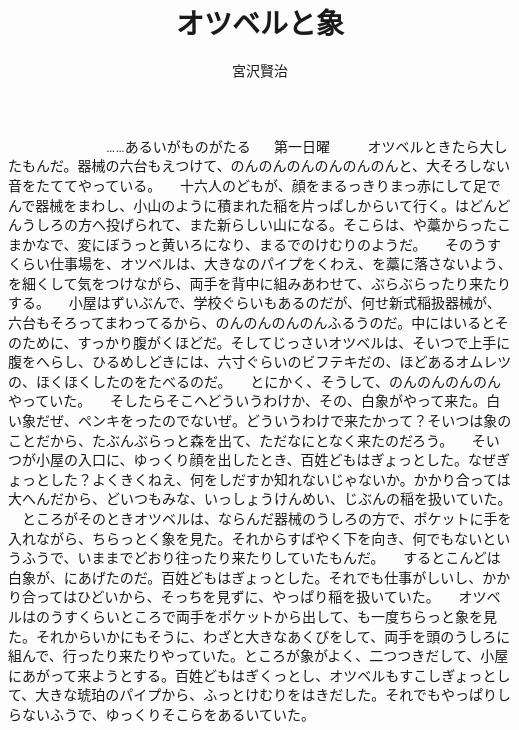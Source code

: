 \documentclass[a5paper, twocolumn]{tbook}
\title{オツベルと象}
\author{宮沢賢治}
\date{}
\begin{document}
\maketitle
　　　　　　　……あるいがものがたる
　
第一日曜
　
　オツベルときたら大したもんだ。器械の六台もえつけて、のんのんのんのんのんのんと、大そろしない音をたててやっている。
　十六人のどもが、顔をまるっきりまっ赤にして足でんで器械をまわし、小山のように積まれた稲を片っぱしからいて行く。はどんどんうしろの方へ投げられて、また新らしい山になる。そこらは、や藁からったこまかなで、変にぼうっと黄いろになり、まるでのけむりのようだ。
　そのうすくらい仕事場を、オツベルは、大きなのパイプをくわえ、を藁に落さないよう、を細くして気をつけながら、両手を背中に組みあわせて、ぶらぶらったり来たりする。
　小屋はずいぶんで、学校ぐらいもあるのだが、何せ新式稲扱器械が、六台もそろってまわってるから、のんのんのんのんふるうのだ。中にはいるとそのために、すっかり腹がくほどだ。そしてじっさいオツベルは、そいつで上手に腹をへらし、ひるめしどきには、六寸ぐらいのビフテキだの、ほどあるオムレツの、ほくほくしたのをたべるのだ。
　とにかく、そうして、のんのんのんのんやっていた。
　そしたらそこへどういうわけか、その、白象がやって来た。白い象だぜ、ペンキをったのでないぜ。どういうわけで来たかって？{}そいつは象のことだから、たぶんぶらっと森を出て、ただなにとなく来たのだろう。
　そいつが小屋の入口に、ゆっくり顔を出したとき、百姓どもはぎょっとした。なぜぎょっとした？{}よくきくねえ、何をしだすか知れないじゃないか。かかり合っては大へんだから、どいつもみな、いっしょうけんめい、じぶんの稲を扱いていた。
　ところがそのときオツベルは、ならんだ器械のうしろの方で、ポケットに手を入れながら、ちらっとく象を見た。それからすばやく下を向き、何でもないというふうで、いままでどおり往ったり来たりしていたもんだ。
　するとこんどは白象が、にあげたのだ。百姓どもはぎょっとした。それでも仕事がしいし、かかり合ってはひどいから、そっちを見ずに、やっぱり稲を扱いていた。
　オツベルはのうすくらいところで両手をポケットから出して、も一度ちらっと象を見た。それからいかにもそうに、わざと大きなあくびをして、両手を頭のうしろに組んで、行ったり来たりやっていた。ところが象がよく、二つつきだして、小屋にあがって来ようとする。百姓どもはぎくっとし、オツベルもすこしぎょっとして、大きな琥珀のパイプから、ふっとけむりをはきだした。それでもやっぱりしらないふうで、ゆっくりそこらをあるいていた。
\end{document}
